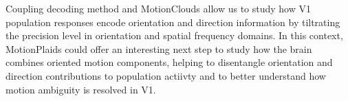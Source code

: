 \documentclass[portrait]{a0poster}
\begin{document}
\begin{minipage}{\textwidth}
\begin{minipage}{0.645\textwidth}
\begin{tcolorbox}
            \end{tcolorbox}
            \vfill
            \begin{tcolorbox}[
                enhanced,
                colframe=blue!60!white,
                colback=white,
                arc=3mm,
                boxsep=5mm,
                boxrule=3pt,
                attach boxed title to top left={xshift=8mm,yshift=-3mm},
                boxed title style={
                    colback=white,
                    colframe=white,
                    sharp corners
                },
                coltitle=black,
                title=\textbf{\Large{Perspectives}}
            ]
                Coupling decoding method and MotionClouds allow us to study how V1 population responses encode orientation and direction information by tiltrating the precision level in orientation and spatial frequency domains.
                In this context, MotionPlaids could offer an interesting next step to study how the brain combines oriented motion components, helping to disentangle orientation and direction contributions to population actiivty and to better understand how motion ambiguity is resolved in V1.
            \end{tcolorbox}
        \end{minipage}    
    \end{minipage}
\end{document}

